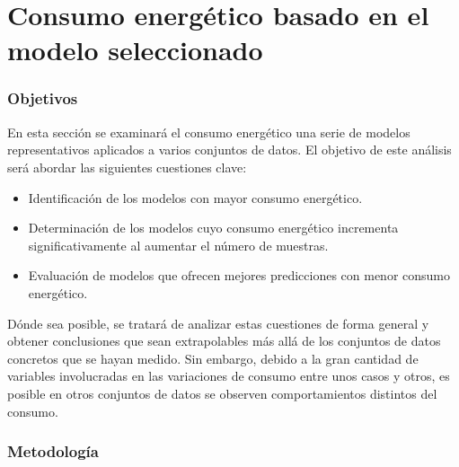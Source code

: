 \section{Consumo energético basado en el modelo seleccionado}
    

\subsubsection{Objetivos}

En esta sección se examinará el consumo energético una serie de modelos representativos aplicados a varios conjuntos de datos. El objetivo de este análisis será abordar las siguientes cuestiones clave:

\begin{itemize}
    \item Identificación de los modelos con mayor consumo energético.
    \item Determinación de los modelos cuyo consumo energético incrementa significativamente al aumentar el número de muestras.
    \item Evaluación de modelos que ofrecen mejores predicciones con menor consumo energético.
\end{itemize}

Dónde sea posible, se tratará de analizar estas cuestiones de forma general y obtener conclusiones que sean extrapolables más allá de los conjuntos de datos concretos que se hayan medido. Sin embargo, debido a la gran cantidad de variables involucradas en las variaciones de consumo entre unos casos y otros, es posible en otros conjuntos de datos se observen comportamientos distintos del consumo.

\subsubsection{Metodología}

